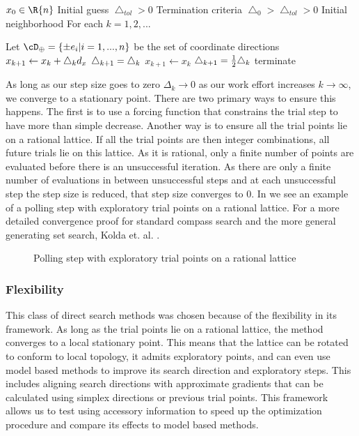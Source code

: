 \begin{algorithm}
\caption{Compass search, a generating set search}\label{dfo_genset}
\begin{algorithmic}
\State $x_0 \in \R{n}$ Initial guess
\State $\bigtriangleup_{tol} >0$ Termination criteria
\State $\bigtriangleup_0 > \bigtriangleup_{tol} >0$ Initial neighborhood
\BState For each $k=1,2,...$

\State Let $\scd =\left\{ \pm e_i| i=1,...,n\right\}$ be the set of coordinate directions
\State $x_{k+1} \gets x_k + \bigtriangleup_k d_x$
\State $\bigtriangleup_{k+1} = \bigtriangleup_k$
\Else
\State $x_{k+1} \gets x_k$
\State $\bigtriangleup_{k+1} = \frac{1}{2} \bigtriangleup_k$
 terminate \EndIf
\EndIf
\EndProcedure
\end{algorithmic}
\end{algorithm}

As long as our step size goes to zero $\Delta_k \rightarrow 0$ as our work effort increases $k\rightarrow \infty$, we converge to a stationary point.  There are two primary ways to ensure this happens.  The first is to use a forcing function that constrains the trial step to have more than simple decrease.  Another way is to ensure all the trial points lie on a rational lattice.  If all the trial points are then integer combinations, all future trials lie on this lattice.  As it is rational, only a finite number of points are evaluated before there is an unsuccessful iteration.  As there are only a finite number of evaluations in between unsuccessful steps and at each unsuccessful step the step size is reduced, that step size converges to 0.  In  we see an example of a polling step with exploratory trial points on a rational lattice. For a more detailed convergence proof for standard compass search and the more general generating set search, Kolda et. al. \cite{kolda_2003}.



\begin{figure}
\centering

\caption{Polling step with exploratory trial points on a rational lattice}\label{fig:explore}
\end{figure}




\subsubsection{Flexibility}
This class of direct search methods was chosen because of the flexibility in its framework.   As long as the trial points lie on a rational lattice, the method converges to a local stationary point.  This means that the lattice can be rotated to conform to local topology, it admits exploratory points, and can even use model based methods to improve its search direction and exploratory steps.  This includes aligning search directions with approximate gradients that can be calculated using simplex directions or previous trial points. This framework allows us to test using accessory information to speed up the optimization procedure and compare its effects to model based methods.


